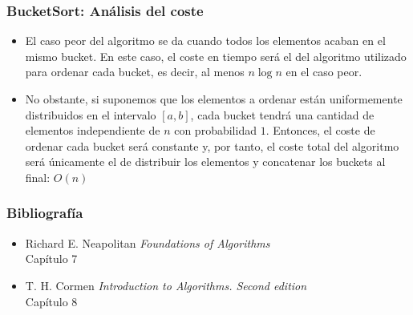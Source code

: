 \documentclass{beamer}
\begin{document}
\begin{frame}
\frametitle{BucketSort: Análisis del coste}
\begin{itemize}
	\item El caso peor del algoritmo se da cuando todos los elementos acaban en el mismo bucket. En este caso, el coste en tiempo será el del algoritmo utilizado para ordenar cada bucket, es decir, al menos $n\log n$ en el caso peor.
	\item No obstante, si suponemos que los elementos a ordenar están uniformemente distribuidos en el intervalo $[a,b]$, cada bucket tendrá una cantidad de elementos independiente de $n$ con probabilidad $1$. Entonces, el coste de ordenar cada bucket será constante y, por tanto, el coste total del algoritmo será únicamente el de distribuir los elementos y concatenar los buckets al final: $O(n)$
\end{itemize}

\end{frame}

\begin{frame}
\frametitle{Bibliografía}
 \begin{itemize}
 	\item Richard E. Neapolitan \textit{Foundations of Algorithms} \\
 	\alert{Capítulo 7}
 	\item T. H. Cormen \textit{Introduction to Algorithms. Second edition}\\
 	\alert{Capítulo 8}
 \end{itemize}
\end{frame}
\end{document}
